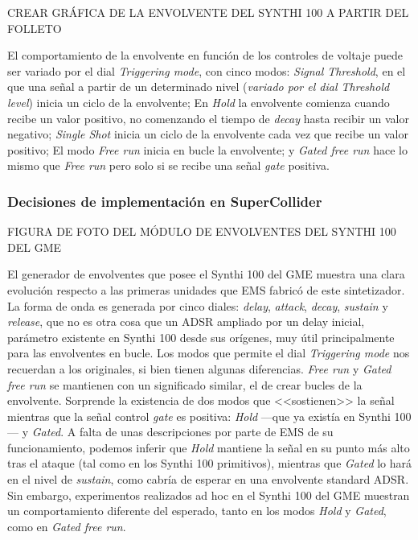 CREAR GRÁFICA DE LA ENVOLVENTE DEL SYNTHI 100 A PARTIR DEL FOLLETO

El comportamiento de la envolvente en función de los controles de voltaje puede ser variado por el dial \textit{Triggering mode}, con cinco modos: \textit{Signal Threshold}, en el que una señal a partir de un determinado nivel (\textit{variado por el dial \textit{Threshold level}}) inicia un ciclo de la envolvente; En \textit{Hold} la envolvente comienza cuando recibe un valor positivo, no comenzando el tiempo de \textit{decay} hasta recibir un valor negativo;  \textit{Single Shot} inicia un ciclo de la envolvente cada vez que recibe un valor positivo; El modo \textit{Free run} inicia en bucle la envolvente; y \textit{Gated free run} hace lo mismo que \textit{Free run} pero solo si se recibe una señal \textit{gate} positiva.

\subsubsection{Decisiones de implementación en SuperCollider}


FIGURA DE FOTO DEL MÓDULO DE ENVOLVENTES DEL SYNTHI 100 DEL GME

El generador de envolventes que posee el Synthi 100 del GME muestra una clara evolución respecto a las primeras unidades que EMS fabricó de este sintetizador. La forma de onda es generada por cinco diales: \textit{delay}, \textit{attack}, \textit{decay}, \textit{sustain} y \textit{release}, que no es otra cosa que un ADSR ampliado por un delay inicial, parámetro existente en Synthi 100 desde sus orígenes, muy útil principalmente para las envolventes en bucle. Los modos que permite el dial \textit{Triggering mode} nos recuerdan a los originales, si bien tienen algunas diferencias. \textit{Free run} y \textit{Gated free run} se mantienen con un significado similar, el de crear bucles de la envolvente. Sorprende la existencia de dos modos que <<sostienen>> la señal mientras que la señal control \textit{gate} es positiva: \textit{Hold} ---que ya existía en Synthi 100--- y \textit{Gated}. A falta de unas descripciones por parte de EMS de su funcionamiento, podemos inferir que \textit{Hold} mantiene la señal en su punto más alto tras el ataque (tal como en los Synthi 100 primitivos), mientras que \textit{Gated} lo hará en el nivel de \textit{sustain}, como cabría de esperar en una envolvente standard ADSR. Sin embargo, experimentos realizados ad hoc en el Synthi 100 del GME muestran un comportamiento diferente del esperado, tanto en los modos \textit{Hold} y \textit{Gated}, como en \textit{Gated free run}.

